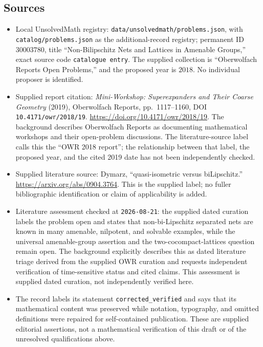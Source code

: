 \documentclass[11pt]{article}
\begin{document}
\subsection{Sources}
\begin{itemize}
\item Local UnsolvedMath registry: \texttt{data/unsolvedmath/problems.json}, with \texttt{catalog/problems.json} as the additional-record registry; permanent ID \(30003780\), title ``Non-Bilipschitz Nets and Lattices in Amenable Groups,'' exact source code \texttt{catalogue entry}. The supplied collection is ``Oberwolfach Reports Open Problems,'' and the proposed year is \(2018\). No individual proposer is identified.
\item Supplied report citation: \emph{Mini-Workshop: Superexpanders and Their Coarse Geometry} (2019), Oberwolfach Reports, pp.\ 1117--1160, DOI \texttt{10.4171/owr/2018/19}. \url{https://doi.org/10.4171/owr/2018/19}. The background describes Oberwolfach Reports as documenting mathematical workshops and their open-problem discussions. The literature-source label calls this the ``OWR 2018 report''; the relationship between that label, the proposed year, and the cited 2019 date has not been independently checked.
\item Supplied literature source: Dymarz, ``quasi-isometric versus biLipschitz.'' \url{https://arxiv.org/abs/0904.3764}. This is the supplied label; no fuller bibliographic identification or claim of applicability is added.
\item Literature assessment checked at \texttt{2026-08-21}: the supplied dated curation labels the problem open and states that non-bi-Lipschitz separated nets are known in many amenable, nilpotent, and solvable examples, while the universal amenable-group assertion and the two-cocompact-lattices question remain open. The background explicitly describes this as dated literature triage derived from the supplied OWR curation and requests independent verification of time-sensitive status and cited claims. This assessment is supplied dated curation, not independently verified here.
\item The record labels its statement \texttt{corrected\_verified} and says that its mathematical content was preserved while notation, typography, and omitted definitions were repaired for self-contained publication. These are supplied editorial assertions, not a mathematical verification of this draft or of the unresolved qualifications above.
\end{itemize}
\end{document}
